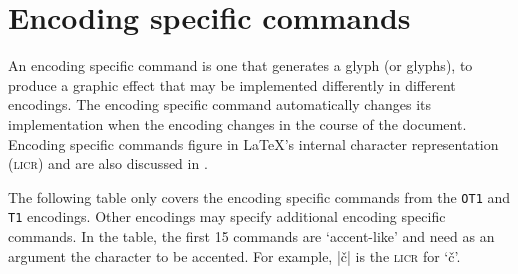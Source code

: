 \documentclass{ltxguide}[1994/11/20]
\providecommand{\Enc}[1]{\texttt{#1}}
\begin{document}

\section{Encoding specific commands}

An encoding specific command is one that generates a glyph (or
glyphs), to produce a graphic effect that may be implemented
differently in different encodings.  The encoding specific command
automatically changes its implementation when the encoding changes in
the course of the document.  Encoding specific commands figure in
\LaTeX's internal character representation (\textsc{licr}) and are also
discussed in \cite[sec.~7.11.2, p.~442]{A-W:MG2004}.

The following table only covers the encoding specific commands from
the \Enc{OT1} and \Enc{T1} encodings. Other encodings may specify
additional encoding specific commands.  In the table, the first 15
commands are `accent-like' and need as an argument the character to be
accented.  For example, |\v{c}| is the \textsc{licr} for `\v{c}'.
\end{document}
